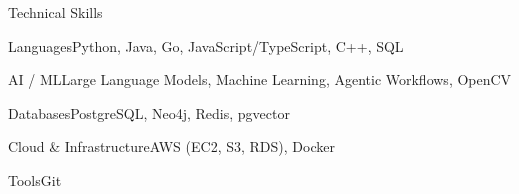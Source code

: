 \documentclass[
	11pt
]{../../../template}
\begin{document}
	\begin{rSection}{T}{echnical Skills}
		\begin{rSet}{Languages}{Python, Java, Go, JavaScript/TypeScript, C++, SQL}
		\end{rSet}
		\begin{rSet}{AI / ML}{Large Language Models, Machine Learning, Agentic Workflows, OpenCV}
		\end{rSet}
		\begin{rSet}{Databases}{PostgreSQL, Neo4j, Redis, pgvector}
		\end{rSet}
		\begin{rSet}{Cloud \& Infrastructure}{AWS (EC2, S3, RDS), Docker}
		\end{rSet}
		\begin{rSet}{Tools}{Git}
		\end{rSet}
	\end{rSection}
\end{document}
